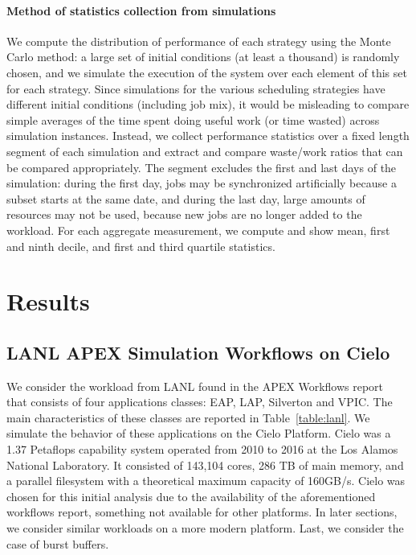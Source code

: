 \documentclass[two]{article}
\begin{document}
\paragraph*{Method of statistics collection from simulations}
We compute the distribution of performance of each strategy using the
Monte Carlo method: a large set of initial conditions (at least a
thousand) is randomly chosen, and we simulate the execution of the
system over each element of this set for each strategy. Since
simulations for the various scheduling strategies have different
initial conditions (including job mix), it would be misleading to
compare simple averages of the time spent doing useful work (or time
wasted) across simulation instances. Instead, we collect performance
statistics over a fixed length segment of each simulation and extract
and compare waste/work ratios that can be compared appropriately. The
segment excludes the first and last days of the simulation: during the
first day, jobs may be synchronized artificially because a subset
starts at the same date, and during the last day, large amounts of
resources may not be used, because new jobs are no longer added to the workload.
For each aggregate measurement, we compute and show mean, first and
ninth decile, and first and third quartile statistics. 

%

\section{Results}\label{sec:results}

\subsection{LANL APEX Simulation Workflows on Cielo}

We consider the workload from LANL found in the APEX Workflows
report~\cite{apex2016} that consists of four applications classes: EAP, LAP,
Silverton and VPIC. The main characteristics of these classes are reported in
Table~\ref{table:lanl}. We simulate the behavior of these applications on the
Cielo Platform. Cielo was a 1.37 Petaflops capability system operated from 2010
to 2016 at the Los Alamos National Laboratory.  It consisted of 143,104 cores,
286 TB of main memory, and a parallel filesystem with a theoretical maximum
capacity of 160GB/s.  Cielo was chosen for this initial analysis due to the
availability of the aforementioned workflows report, something not available for
other platforms. In later sections, we consider similar workloads on a more
modern platform. Last, we consider the case of burst buffers.
\end{document}
